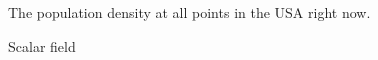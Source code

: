 The population density at all points in the USA right now.

\begin{solution}
    Scalar field
\end{solution}